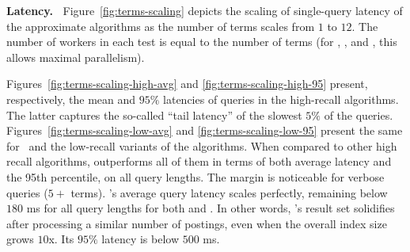 {{{\bf Latency.\ } 
Figure~\ref{fig:terms-scaling} depicts the scaling of single-query latency of the approximate algorithms  
as the number of terms scales from $1$ to $12$. The number of workers in each test 
is equal to the number of terms (for \alg, \pRA, and \pNRA, this allows maximal parallelism). 

Figures~\ref{fig:terms-scaling-high-avg} and \ref{fig:terms-scaling-high-95} present, respectively, the  mean and  
$95\%$ latencies of queries in the high-recall algorithms. The latter captures the so-called ``tail latency'' of 
the slowest $5\%$ of the queries. Figures~\ref{fig:terms-scaling-low-avg} and \ref{fig:terms-scaling-low-95} present the same for \alg\hi\ and the low-recall variants of the algorithms.
%
When compared to other high recall algorithms, \alg\/ outperforms all of them in terms of both average latency and the 95th percentile, on all query lengths.
The margin is noticeable for verbose queries
($5+$ terms). \alg's average query latency scales perfectly, 
remaining below $180$ ms for all query lengths
 for both \cw\/ and \cwten.  
In other words, \alg's result set solidifies after processing 
a similar number of postings, 
 even when the overall index size grows $10$x. 
Its  $95\%$ latency is below $500$ ms. 


\begin{figure}[tbh]


\end{figure}}}
